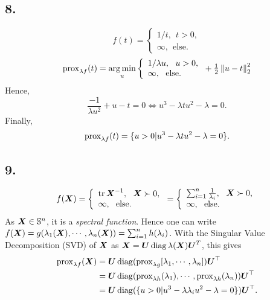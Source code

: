 \subsection{8.}
%
\begin{equation*}
    f(t) = \left\{
        \begin{array}{ll}
          1/t,~~t>0, \\
            \infty,~~ \text{else}.
        \end{array}
      \right.
\end{equation*}
%
\begin{equation*}
    \operatorname{prox}_{\lambda f}(t) = \operatorname*{arg\,min}_u \left\{
        \begin{array}{ll}
          1/{\lambda u},~~u>0, \\
            \infty,~~ \text{else}.
        \end{array}
    \right. + {\textstyle\frac{1}{2}} \left\lVert u-t\right\rVert_{2}^2 
\end{equation*}
%
Hence,
%
\begin{equation*}
    \frac{-1}{\lambda u^2} + u - t = 0 \Leftrightarrow 
    u^3 - \lambda tu^2-\lambda=0.
\end{equation*}
%
Finally,
%
\begin{equation}
    \operatorname{prox}_{\lambda f}(t) = \{ u>0 | u^3 
    - \lambda tu^2-\lambda=0  \}.
\end{equation}
%
\subsection{9.}
%
\begin{equation*}
    f(\boldsymbol X) = \left\{
        \begin{array}{ll}
          \operatorname{tr} \boldsymbol X^{-1},~~\boldsymbol X \succ 0, \\
            \infty,~~ \text{else}.
        \end{array}
    \right.
    = \left\{
        \begin{array}{ll}
        \sum_{i=1}^n {\textstyle\frac{1}{\lambda_i}},~~\boldsymbol X \succ 0, \\
            \infty,~~ \text{else}.
        \end{array}
    \right. 
\end{equation*}
%
As $\boldsymbol X \in \mathbb S^n$, it is a \emph{spectral function}.
Hence one can write $f(\boldsymbol X) = g(\lambda_1(\boldsymbol X), \cdots,
\lambda_n(\boldsymbol X)) = \sum_{i=1}^n h(\lambda_i)$. 
%
With the Singular Value Decomposition (SVD) of $\boldsymbol X$ as 
$\boldsymbol X = \boldsymbol U \operatorname{diag}{\lambda (\boldsymbol X)} \boldsymbol U^T$, this gives
%
\begin{align*}
\begin{split}
    \operatorname{prox}_{\lambda f} (\boldsymbol X) &= \boldsymbol U \operatorname{diag}(\operatorname{prox}_{\lambda g} 
    [\lambda_1,\cdots, \lambda_n]) \boldsymbol U^\top \\
    &= \boldsymbol U \operatorname{diag}(\operatorname{prox}_{\lambda h} (\lambda_1), \cdots,
    \operatorname{prox}_{\lambda h} (\lambda_n)) \boldsymbol U^\top \\
    &= \boldsymbol U \operatorname{diag}(\{ u>0| u^3-\lambda \lambda_i u^2-\lambda=0 \})
    \boldsymbol U^\top.
\end{split}
\end{align*}
%
